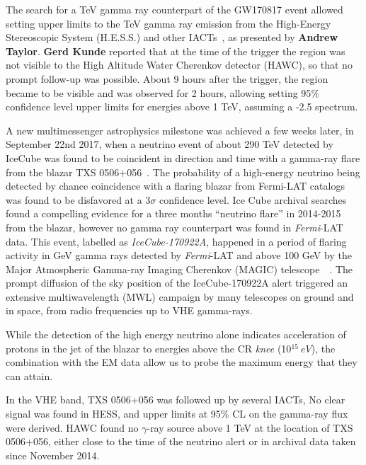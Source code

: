 \documentclass{PoS}
\begin{document}
The search for a TeV gamma ray counterpart of the GW170817 event allowed setting upper limits to the TeV gamma ray emission from the High-Energy Stereoscopic System (H.E.S.S.)
and other IACTs~\cite{TheMMpaper}, as presented by {\bf Andrew Taylor}. 
{\bf Gerd Kunde} reported that at the time of the trigger the region was not visible to the High Altitude Water Cherenkov detector (HAWC), so that no prompt follow-up was possible. About 9 hours after the trigger, the region became to be visible and was observed for 2 hours, allowing setting 95$\%$ confidence level upper limits for energies above 1 TeV, assuming a -2.5 spectrum. 

A new multimessenger astrophysics milestone was achieved a few weeks later, in September 22nd 2017, when a  neutrino event of about 290 TeV detected by IceCube was found to be coincident in direction and time with a gamma-ray flare from the blazar TXS 0506+056~\cite{IceCube:2018dnn}.
The probability of a high-energy neutrino being detected by chance coincidence with a flaring blazar from Fermi-LAT catalogs was found to be disfavored at a 3$\sigma$ confidence level. Ice Cube archival searches  found a compelling evidence for a three months ``neutrino flare'' in 2014-2015 from the blazar, however no gamma ray  counterpart was found in \textit{Fermi}-LAT data. This event, labelled as \textit{IceCube-170922A}, happened in a period of flaring activity in GeV gamma rays detected by \textit{Fermi}-LAT and 
 above 100 GeV by the Major Atmospheric Gamma-ray Imaging Cherenkov (MAGIC) telescope~\cite{IceCube:2018cha}~\cite{MAGIC}.  The prompt diffusion of the sky position of the IceCube-170922A alert triggered an extensive multiwavelength (MWL) campaign by many telescopes on ground and in space, from radio frequencies up to VHE gamma-rays. 
 
While the detection of the high energy neutrino alone indicates acceleration of protons in the jet of the blazar to energies above the CR \textit{knee} (10$^{15}~eV$), the combination with the EM data allow us to probe the maximum energy that they can attain.

In the VHE band, TXS 0506+056 was followed up by several IACTs, 
No clear signal was found in HESS, and upper limits at 95$\%$ CL on the gamma-ray flux were derived. 
HAWC found no $\gamma$-ray source above 1 TeV at the location of TXS 0506+056, either close to the time of the neutrino alert or in archival data taken since November 2014.
\end{document}
